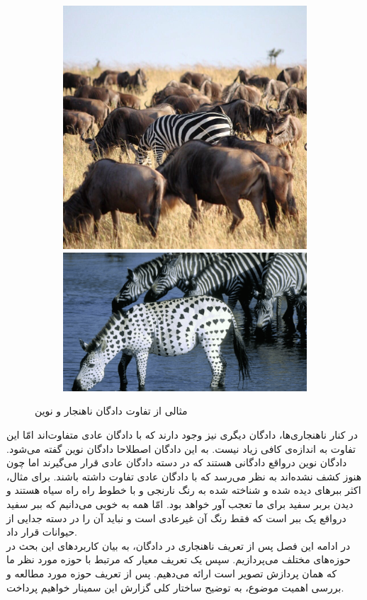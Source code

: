 \documentclass[12pt,a4paper]{report}
\theoremstyle{definition}
\theoremstyle{definition}
\begin{document}
	\begin{figure}[hp]
		  \begin{subfigure}{\linewidth}
			  \includegraphics[width=.5\linewidth]{./images/figures/zibra-anomaly.png}\hfill
			  \includegraphics[width=.5\linewidth]{./images/figures/zibra-novel.png}
		  \end{subfigure}\par\medskip		  
		  \caption{مثالی از تفاوت دادگان ناهنجار و نوین}
		  \label{fig:novel-vs-anomaly}
	\end{figure}

در کنار ناهنجاری‌ها، دادگان دیگری نیز وجود دارند که با دادگان عادی متفاوت‌اند امّا این تفاوت به اندازه‌ی کافی زیاد نیست. به این دادگان اصطلاحا دادگان نوین گفته می‌شود. دادگان نوین درواقع دادگانی هستند که در دسته دادگان عادی قرار می‌گیرند اما چون هنوز کشف نشده‌اند به نظر می‌رسد که با دادگان عادی تفاوت داشته باشند. برای مثال، اکثر ببر‌های دیده شده و شناخته شده به رنگ نارنجی و با خطوط راه راه سیاه هستند و دیدن بربر سفید برای ما تعجب آور خواهد بود. امّا همه به خوبی می‌دانیم که ببر سفید درواقع یک ببر است که فقط رنگ آن غیرعادی است و نباید آن را در دسته جدایی از حیوانات قرار داد.\\

در ادامه این فصل پس از تعریف ناهنجاری در دادگان، به بیان کاربرد‌های این بحث در حوزه‌های مختلف می‌پردازیم. سپس یک تعریف معیار که مرتبط با حوزه مورد نظر ما که همان پردازش تصویر است ارائه می‌دهیم. پس از تعریف حوزه مورد مطالعه و بررسی اهمیت موضوع، به توضیح ساختار کلی گزارش این سمینار خواهیم پرداخت.
		
\end{document}
